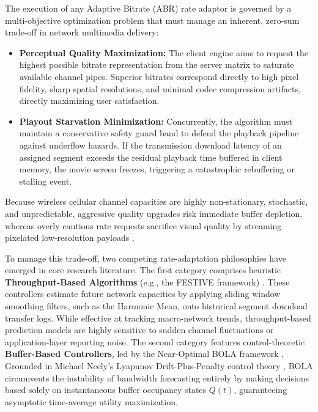 \documentclass[conference]{IEEEtran}
\begin{document}
The execution of any Adaptive Bitrate (ABR) rate adaptor is governed by a multi-objective optimization problem that must manage an inherent, zero-sum trade-off in network multimedia delivery:
\begin{itemize}
    \item \textbf{Perceptual Quality Maximization:} The client engine aims to request the highest possible bitrate representation from the server matrix to saturate available channel pipes. Superior bitrates correspond directly to high pixel fidelity, sharp spatial resolutions, and minimal codec compression artifacts, directly maximizing user satisfaction.
    \item \textbf{Playout Starvation Minimization:} Concurrently, the algorithm must maintain a conservative safety guard band to defend the playback pipeline against underflow hazards. If the transmission download latency of an assigned segment exceeds the residual playback time buffered in client memory, the movie screen freezes, triggering a catastrophic rebuffering or stalling event.
\end{itemize}
Because wireless cellular channel capacities are highly non-stationary, stochastic, and unpredictable, aggressive quality upgrades risk immediate buffer depletion, whereas overly cautious rate requests sacrifice visual quality by streaming pixelated low-resolution payloads \cite{spiteri2020}.

To manage this trade-off, two competing rate-adaptation philosophies have emerged in core research literature. The first category comprises heuristic \textbf{Throughput-Based Algorithms} (e.g., the FESTIVE framework) \cite{jiang2012}. These controllers estimate future network capacities by applying sliding window smoothing filters, such as the Harmonic Mean, onto historical segment download transfer logs. While effective at tracking macro-network trends, throughput-based prediction models are highly sensitive to sudden channel fluctuations or application-layer reporting noise. The second category features control-theoretic \textbf{Buffer-Based Controllers}, led by the Near-Optimal BOLA framework \cite{spiteri2020}. Grounded in Michael Neely’s Lyapunov Drift-Plus-Penalty control theory \cite{neely2010}, BOLA circumvents the instability of bandwidth forecasting entirely by making decisions based solely on instantaneous buffer occupancy states $Q(t)$, guaranteeing asymptotic time-average utility maximization.
\end{document}
